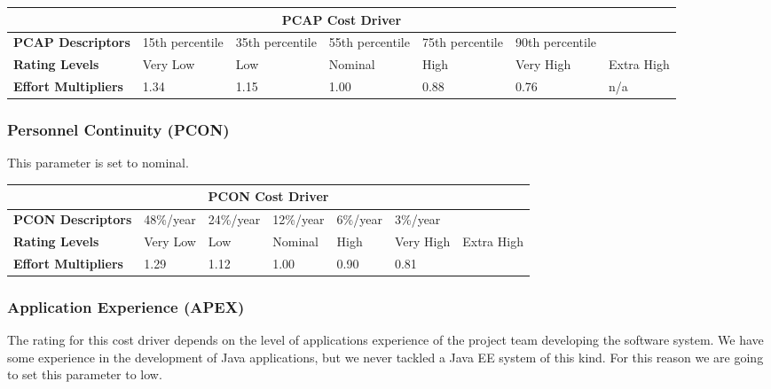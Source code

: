 \begin{table}[H]
	\centering
	\begin{tabular}{| m{1.8cm} | m{1.6cm} | m{1.6cm} | m{1.6cm} | m{1.6cm} | m{1.6cm} | m{0.9cm} | }
		\hline
		\multicolumn{7}{|c|}{ \textbf{PCAP Cost Driver} } \\
		\hline
		\hline
		\textbf{PCAP Descriptors} & 15th \newline percentile & 35th \newline percentile & 55th \newline percentile & 75th \newline percentile & 90th \newline percentile & \\
		\hline
		\textbf{Rating Levels} & Very Low & Low & Nominal & High & Very High & Extra High \\
		\hline
		\textbf{Effort Multipliers} & 1.34 & 1.15 & 1.00 & 0.88 & 0.76 & n/a \\ 
		\hline
	\end{tabular}
\end{table}

\subsubsection*{Personnel Continuity (PCON)}
This parameter is set to nominal.

\begin{table}[H]
	\centering
	\begin{tabular}{| m{1.8cm} | m{1.6cm} | m{1.6cm} | m{1.6cm} | m{1.6cm} | m{1.6cm} | m{0.9cm} | }
		\hline
		\multicolumn{7}{|c|}{ \textbf{PCON Cost Driver} } \\
		\hline
		\hline
		\textbf{PCON Descriptors} & 48\%/year & 24\%/year & 12\%/year & 6\%/year & 3\%/year & \\
		\hline
		\textbf{Rating Levels} & Very Low & Low & Nominal & High & Very High & Extra High \\
		\hline
		\textbf{Effort Multipliers} & 1.29 & 1.12 & 1.00 & 0.90 & 0.81 &  \\ 
		\hline
	\end{tabular}
\end{table}
\newpage
\subsubsection*{Application Experience (APEX)}
The rating for this cost driver depends on the level of applications experience of the project team developing the software system. We have some experience in the development of Java applications, but we never tackled a Java EE system of this kind. For this reason we are going to set this parameter to low.

